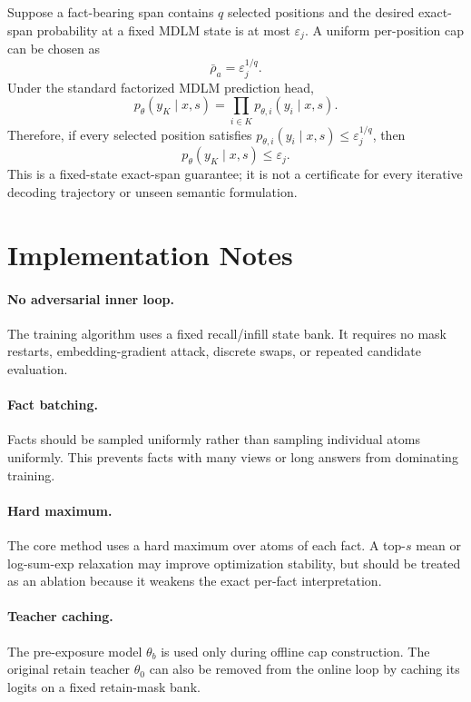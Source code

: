 \documentclass[11pt]{article}
\begin{document}
Suppose a fact-bearing span contains $q$ selected positions and the desired exact-span probability at a fixed MDLM state is at most $\varepsilon_j$. A uniform per-position cap can be chosen as
\begin{equation}
    \bar\rho_a=\varepsilon_j^{1/q}.
\end{equation}
Under the standard factorized MDLM prediction head,
\begin{equation}
    p_{\theta}(y_K\mid x,s)
    = \prod_{i\in K}p_{\theta,i}(y_i\mid x,s).
\end{equation}
Therefore, if every selected position satisfies $p_{\theta,i}(y_i\mid x,s)\leq\varepsilon_j^{1/q}$, then
\begin{equation}
    p_{\theta}(y_K\mid x,s)\leq\varepsilon_j.
\end{equation}
This is a fixed-state exact-span guarantee; it is not a certificate for every iterative decoding trajectory or unseen semantic formulation.

\section{Implementation Notes}

\paragraph{No adversarial inner loop.}
The training algorithm uses a fixed recall/infill state bank. It requires no mask restarts, embedding-gradient attack, discrete swaps, or repeated candidate evaluation.

\paragraph{Fact batching.}
Facts should be sampled uniformly rather than sampling individual atoms uniformly. This prevents facts with many views or long answers from dominating training.

\paragraph{Hard maximum.}
The core method uses a hard maximum over atoms of each fact. A top-$s$ mean or log-sum-exp relaxation may improve optimization stability, but should be treated as an ablation because it weakens the exact per-fact interpretation.

\paragraph{Teacher caching.}
The pre-exposure model $\theta_b$ is used only during offline cap construction. The original retain teacher $\theta_0$ can also be removed from the online loop by caching its logits on a fixed retain-mask bank.
\end{document}
